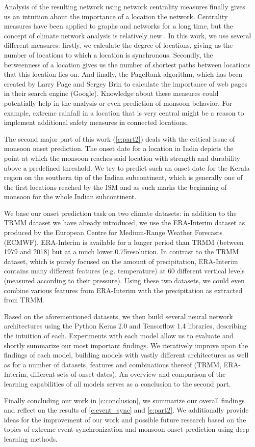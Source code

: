 Analysis of the resulting network using network centrality measures finally gives us an intuition about the importance of a location the network. Centrality measures have been applied to graphs and networks for a long time, but the concept of climate network analysis is relatively new \citep{Malik.2010}. In this work, we use several different measures: firstly, we calculate the degree of locations, giving us the number of locations to which a location is synchronous. Secondly, the betweenness of a location gives us the number of shortest paths between locations that this location lies on. And finally, the PageRank algorithm, which has been created by Larry Page and Sergey Brin to calculate the importance of web pages in their search engine (Google). Knowledge about these measures could potentially help in the analysis or even prediction of monsoon behavior. For example, extreme rainfall in a location that is very central might be a reason to implement additional safety measures in connected locations.

The second major part of this work (\cref{c:part2}) deals with the critical issue of monsoon onset prediction. The onset date for a location in India depicts the point at which the monsoon reaches said location with strength and durability above a predefined threshold. We try to predict such an onset date for the Kerala region on the southern tip of the Indian subcontinent, which is generally one of the first locations reached by the ISM and as such marks the beginning of monsoon for the whole Indian subcontinent.

We base our onset prediction task on two climate datasets: in addition to the TRMM dataset we have already introduced, we use the ERA-Interim dataset as produced by the European Centre for Medium-Range Weather Forecasts (ECMWF). ERA-Interim is available for a longer period than TRMM (between 1979 and 2018) but at a much lower 0.75\degree resolution. In contrast to the TRMM dataset, which is purely focused on the amount of precipitation, ERA-Interim contains many different features (e.g. temperature) at 60 different vertical levels (measured according to their pressure). Using these two datasets, we could even combine various features from ERA-Interim with the precipitation as extracted from TRMM.

Based on the aforementioned datasets, we then build several neural network architectures using the Python Keras 2.0 and Tensorflow 1.4 libraries, describing the intuition of each. Experiments with each model allow us to evaluate and shortly summarize our most important findings. We iteratively improve upon the findings of each model, building models with vastly different architectures as well as for a number of datasets, features and combinations thereof (TRMM, ERA-Interim, different sets of onset dates). An overview and comparison of the learning capabilities of all models serves as a conclusion to the second part.

Finally concluding our work in \cref{c:conclusion}, we summarize our overall findings and reflect on the results of \cref{c:event_sync} and \cref{c:part2}. We additionally provide ideas for the improvement of our work and possible future research based on the topics of extreme event synchronization and monsoon onset prediction using deep learning methods.
